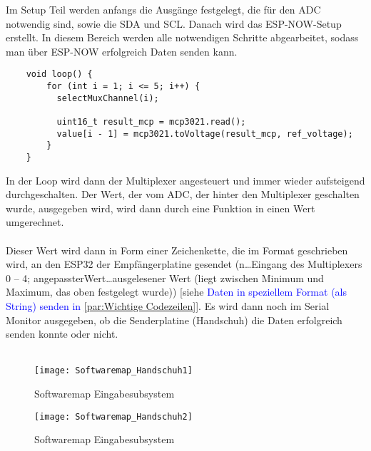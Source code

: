 \documentclass[titlepage,12pt,twoside]{article}
\begin{document}
\hfill \break
\normalsize
Im Setup Teil werden anfangs die Ausgänge festgelegt, die für den ADC notwendig sind, sowie die SDA und SCL. Danach wird das 
ESP-NOW-Setup erstellt. In diesem Bereich werden alle notwendigen Schritte abgearbeitet, sodass man über ESP-NOW erfolgreich 
Daten senden kann. \\
\footnotesize
\begin{lstlisting}
	void loop() {
		for (int i = 1; i <= 5; i++) {
		  selectMuxChannel(i);
	  
		  uint16_t result_mcp = mcp3021.read();
		  value[i - 1] = mcp3021.toVoltage(result_mcp, ref_voltage);	
		}
	}			
\end{lstlisting}
\hfill \break
\normalsize
In der Loop wird dann der Multiplexer angesteuert und immer wieder aufsteigend durchgeschalten. Der Wert, der vom ADC, der
hinter den Multiplexer geschalten wurde, ausgegeben wird, wird dann durch eine Funktion in einen Wert umgerechnet. \\
\\
Dieser Wert wird dann in Form einer Zeichenkette, die im Format  geschrieben wird, an den ESP32 der 
Empfängerplatine gesendet (n…Eingang des Multiplexers 0 – 4; angepassterWert…ausgelesener Wert (liegt zwischen Minimum und 
Maximum, das oben festgelegt wurde)) [siehe \textcolor{blue}{Daten in speziellem Format (als String) senden in \autoref{par:Wichtige Codezeilen}}]. Es wird dann noch im Serial Monitor ausgegeben, ob die Senderplatine (Handschuh) die 
Daten erfolgreich senden konnte oder nicht. \\
\\
\begin{figure}[H]
	\begin{center}
		\scalebox{1.2}
		{\texttt{[image: Softwaremap\_Handschuh1]}}
		\caption{Softwaremap Eingabesubsystem}
		\label{fig:Softwaremap_Handschuh}			
	\end{center}
\end{figure}
\begin{figure}[H]
	\begin{center}
		\scalebox{1.2}
		{\texttt{[image: Softwaremap\_Handschuh2]}}
		\caption{Softwaremap Eingabesubsystem}
		\label{fig:Softwaremap_Handschuh}			
	\end{center}
\end{figure}
\end{document}
